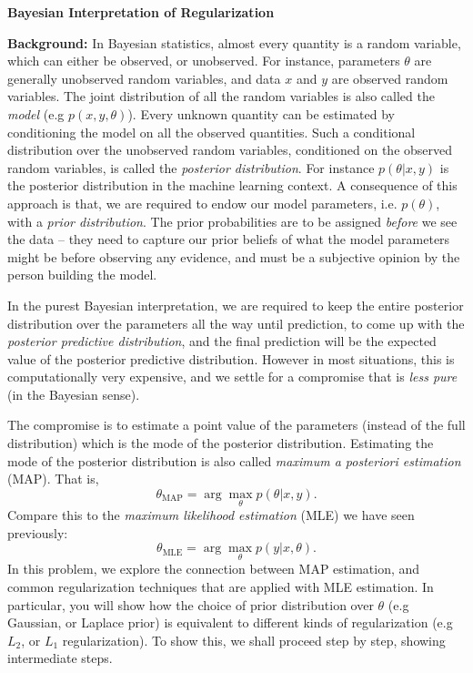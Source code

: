 \clearpage
\item {} {\bf Bayesian Interpretation of Regularization}

\textbf{Background: }
In Bayesian statistics, almost every quantity is a random variable, which
can either be observed, or unobserved. For instance, parameters $\theta$ are
generally unobserved random variables, and data $x$ and $y$ are observed
random variables. The joint distribution of all the random variables is
also called the \emph{model} (e.g $p(x, y, \theta)$). Every unknown quantity can
be estimated by conditioning the model on all the observed quantities. Such
a conditional distribution over the unobserved random variables, conditioned
on the observed random variables, is called the \emph{posterior distribution}.
For instance $p(\theta | x, y)$ is the posterior distribution in the
machine learning context. A consequence of this approach is that, we are
required to endow our model parameters, i.e. $p(\theta)$, with a \emph{prior distribution}.
The prior probabilities are to be assigned \emph{before} we see the data --
they need to capture our prior beliefs of what the model parameters might be
before observing any evidence, and must be a subjective opinion by the person
building the model.


In the purest Bayesian interpretation, we are required to keep the entire
posterior distribution over the parameters all the way until prediction, to
come up with the \emph{posterior predictive distribution}, and the final prediction
will be the expected value of the posterior predictive distribution. However
in most situations, this is computationally very expensive, and we settle for
a compromise that is \emph{less pure} (in the Bayesian sense).

The compromise is to estimate a point value of the parameters (instead of the
full distribution) which is the mode of the posterior distribution. Estimating
the mode of the posterior distribution is also called
\emph{maximum a posteriori estimation} (MAP). That is, 
$$\theta_{\text{MAP}} = \arg\max_\theta p(\theta|x,y).$$
Compare this to the \emph{maximum likelihood estimation} (MLE) we have
seen previously:
$$\theta_{\text{MLE}} = \arg\max_\theta p(y|x,\theta).$$
In this problem, we explore the connection between MAP estimation, and common
regularization techniques that are applied with MLE estimation.
In particular, you will show how the choice of prior distribution over $\theta$ (e.g
Gaussian, or Laplace prior)
is equivalent to different kinds of regularization (e.g $L_2$, or $L_1$
regularization). To show this, we shall proceed step by step, showing intermediate
steps.


